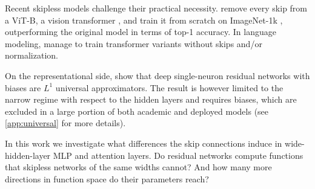 \documentclass[10pt]{article}
\theoremstyle{definition}
\theoremstyle{remark}
\begin{document}
Recent skipless models challenge their practical necessity. \citet{ji2026cutting} remove every skip from a ViT-B, a vision transformer \citep{dosovitskiy2021an}, and train it from scratch on ImageNet-1k \citep{russakovsky2015imagenet}, outperforming the original model in terms of top-1 accuracy. In language modeling, \citet{he2023shortcuts, he2024simplifying} manage to train transformer variants without skips and/or normalization.

On the representational side, \citet{lin2018resnet} show that deep single-neuron residual networks with biases are $L^1$ universal approximators. The result is however limited to the narrow regime with respect to the hidden layers and requires biases, which are excluded in a large portion of both academic and deployed models \citep{olmo2025olmo2,yang2025qwen3,liu2026ministral3,mistral2026small4,karpathy2023nanogpt} (see \cref{app:universal} for more details).

In this work we investigate what differences the skip connections induce in wide-hidden-layer MLP and attention layers. Do residual networks compute functions that skipless networks of the same widths cannot? And how many more directions in function space do their parameters reach?
\end{document}
